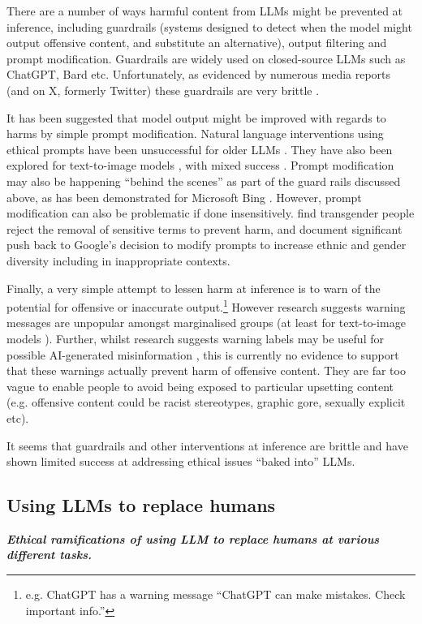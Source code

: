 \noindent There are a number of ways harmful content from LLMs might be prevented at inference, including guardrails (systems designed to detect when the model might output offensive content, and substitute an alternative), output filtering and prompt modification. Guardrails are widely used on closed-source LLMs such as ChatGPT, Bard etc. Unfortunately, as evidenced by numerous media reports (and on X, formerly Twitter) these guardrails are very brittle \citep{cuthbertson_chatgpt_2023}.

It has been suggested that model output might be improved with regards to harms by simple prompt modification. Natural language interventions using ethical prompts have been unsuccessful for older LLMs \citep{zhao_ethical-advice_2021}. They have also been explored for text-to-image models \citep{bansal_how_2022}, with mixed success
\citep{shin_can_2024}. Prompt modification may also be happening ``behind the scenes'' as part of the guard rails discussed above, as has been demonstrated for Microsoft Bing \citep{edwards_ai-powered_2023}. However, prompt modification can also be problematic if done insensitively. \citet{ungless_stereotypes_2023} find transgender people reject the removal of sensitive terms to prevent harm, and \citet{vynck_google_2024} document significant push back to Google's decision to modify prompts to increase ethnic and gender diversity including in inappropriate contexts.

Finally, a very simple attempt to lessen harm at inference is to warn of the potential for offensive or inaccurate output.\footnote{e.g. ChatGPT has a warning message ``ChatGPT can make mistakes. Check important info.''} However research suggests warning messages are unpopular amongst marginalised groups (at least for text-to-image models \cite{ungless_stereotypes_2023}). Further, whilst research suggests warning labels may be useful for possible AI-generated misinformation \citep{wittenberg_labeling_2024}, this is currently no evidence to support that these warnings actually prevent harm of offensive content. They are far too vague to enable people to avoid being exposed to particular upsetting content (e.g. offensive content could be racist stereotypes, graphic gore, sexually explicit etc).

It seems that guardrails and other interventions at inference are brittle and have shown limited success at addressing ethical issues ``baked into'' LLMs.

\subsection{Using LLMs to replace humans}\label{sec:replacehumans}\noindent\textbf{\textit{Ethical ramifications of using LLM to replace humans at various different tasks.}}
\newline 

